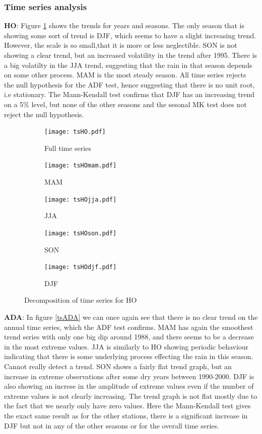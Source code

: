 \documentclass{article}
\begin{document}
	\subsubsection{Time series analysis}
	{\Large\textbf{HO}}: Figure \ref{tsHO} shows the trends for years and seasons. The only season that is showing some sort of trend is DJF, which seems to have a slight increasing trend. However, the scale is so small,that it is more or less neglectible. SON is not showing a clear trend, but an increased volatility in the trend after 1995. There is a big volatilty in the JJA trend, suggesting that the rain in that season depends on some other process. MAM is the most steady season. All time series rejects the null hypothesis for the ADF test, hence suggesting that there is no unit root, i.e stationary. 
	The Mann-Kendall test confirms that DJF has an increasing trend on a 5\% level, but none of the other seasons and the sesonal MK test does not reject the null hypothesis.
	\begin{figure}[H]
		\centering
		\begin{subfigure}{0.6\textwidth}
			\centering
			\texttt{[image: tsHO.pdf]}
			\caption{Full time series}
		\end{subfigure}
		\begin{subfigure}{0.5\textwidth}
			\centering
			\texttt{[image: tsHOmam.pdf]}
			\caption{MAM}
		\end{subfigure}%
		\begin{subfigure}{0.5\textwidth}
			\centering
			\texttt{[image: tsHOjja.pdf]}
			\caption{JJA}
		\end{subfigure}
		\begin{subfigure}{0.5\textwidth}
			\centering
			\texttt{[image: tsHOson.pdf]}
			\caption{SON}
		\end{subfigure}%
		\begin{subfigure}{0.5\textwidth}
			\centering
			\texttt{[image: tsHOdjf.pdf]}
			\caption{DJF}
		\end{subfigure}%
		\caption{Decomposition of time series for HO}
		\label{tsHO}
	\end{figure}

	{\Large\textbf{ADA}}: In figure \ref{tsADA} we can once again see that there is no clear trend on the annual time series, which the ADF test confirms. MAM has again the smoothest trend series with only one big dip around 1988, and there seems to be a decrease in the most extreme values. JJA is similarly to HO showing periodic behaviour indicating that there is some underlying process effecting the rain in this season. Cannot really detect a trend. SON shows a fairly flat trend graph, but an increase in extreme observations after some dry years between 1990-2000. DJF is also showing an increse in the amplitude of extreme values even if the number of extreme values is not clearly increasing. The trend graph is not flat mostly due to the fact that we nearly only have zero values.
	Here the Mann-Kendall test gives the exact same result as for the other stations, there is a significant increase in DJF but not in any of the other seasons or for the overall time series.
	
\end{document}
